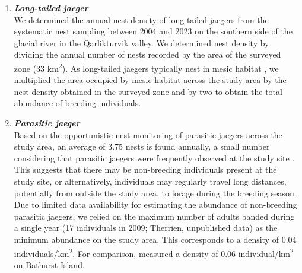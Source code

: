 \documentclass[a4paper,twoside,12pt]{article}
\begin{document}
\begin{enumerate}[label=\alph*.]
        	\item[] \textit{\textbf{Long-tailed jaeger}}\\
        	We determined the annual nest density of long-tailed jaegers from the systematic nest sampling between 2004 and 2023 on the southern side of the glacial river in the Qarlikturvik valley. We determined nest density by dividing the annual number of nests recorded by the area of the surveyed zone (33 km\textsuperscript{2}). As long-tailed jaegers typically nest in mesic habitat \citep{andersson1971}, we multiplied the area occupied by mesic habitat across the study area by the nest density obtained in the surveyed zone and by two to obtain the total abundance of breeding individuals.
        	
        	\item[] \textit{\textbf{Parasitic jaeger}}\\
        	Based on the opportunistic nest monitoring of parasitic jaegers across the study area, an average of 3.75 nests is found annually, a small number considering that parasitic jaegers were frequently observed at the study site \citep{gauthier2024a}. This suggests that there may be non-breeding individuals present at the study site, or alternatively, individuals may regularly travel long distances, potentially from outside the study area, to forage during the breeding season. Due to limited data availability for estimating the abundance of non-breeding parasitic jaegers, we relied on the maximum number of adults banded during a single year (17 individuals in 2009; Therrien, unpublished data) as the minimum abundance on the study area. This corresponds to a density of 0.04 individuals/km\textsuperscript{2}. For comparison, \citet{taylor1974} measured a density of 0.06 individual/km\textsuperscript{2} on Bathurst Island.
        	

\end{enumerate}
\end{document}
